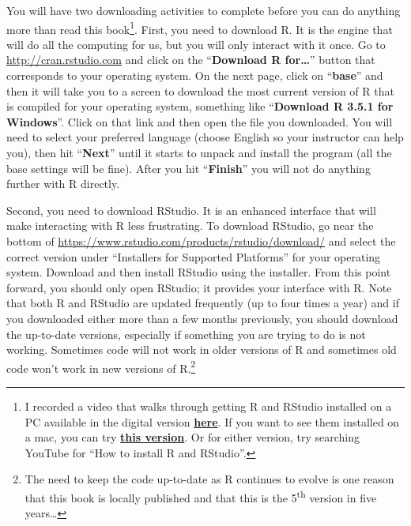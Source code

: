 \documentclass[]{book}
\let\rmarkdownfootnote\footnote%
\def\footnote{\protect\rmarkdownfootnote}
\renewcommand{\indent}{\hspace{15pt}}
\begin{document}
\indent You will have two downloading activities to complete before you can do anything
more than read this book\footnote{I recorded a video that walks through getting R and RStudio installed on a PC available in the digital version \href{https://montana.techsmithrelay.com/J1Ww}{\textbf{here}}. If you want to see them installed on a mac, you can try \href{https://www.youtube.com/watch?v=GFImMj1lMRI}{\textbf{this version}}. Or for either version, try searching YouTube for ``How to install R and RStudio''.}. First, you need to download R. It is the engine that will do all the computing
for us, but you will only interact with it once. Go to \url{http://cran.rstudio.com}
and click on the ``\textbf{Download R for\ldots{}}'' button that
corresponds to your operating system. On the next page, click on ``\textbf{base}'' and then it will take you
to a screen to download the most current version of R that is compiled for your
operating system, something like ``\textbf{Download R 3.5.1 for Windows}''. Click on that link and then open
the file you downloaded. You will need to select your preferred language (choose English so your instructor can help you), then hit ``\textbf{Next}''
until it starts to unpack and install the program (all the base settings will be fine). After you hit ``\textbf{Finish}'' you will not do anything further with R directly.

\indent Second, you need to download RStudio. It is an enhanced interface that will make interacting with
R less frustrating. To download RStudio, go near the bottom of \url{https://www.rstudio.com/products/rstudio/download/} and select the correct version under
``Installers for Supported Platforms'' for your operating system. Download and
then install RStudio using the installer. From this point forward, you should only
open RStudio; it provides your interface with R. Note that both R and RStudio
are updated frequently (up to four times a year) and if you downloaded either
more than a few months previously, you should download the up-to-date versions,
especially if something you are trying to do is not working. Sometimes code
will not work in older versions of R and sometimes old code won't work in new
versions of R.\footnote{The need to keep the code up-to-date as R continues to evolve is one reason that this book is locally published and that this is the 5\textsuperscript{th} version in
  five years\ldots{}}
\end{document}
